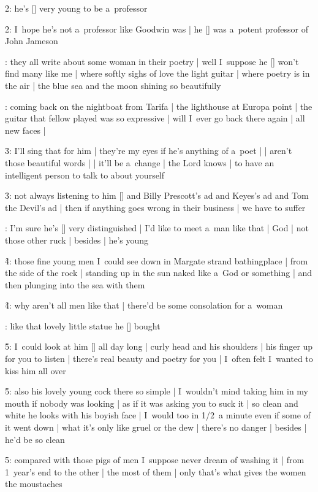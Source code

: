 \f2:
he's [\stephen] very young to be a~professor

\f2:
I~hope he's not a~professor like Goodwin was |
he [\goodwin] was a~potent professor of John Jameson

:
they all write about some woman in their poetry |
well I~suppose he [\stephen] won't find many like me |
where softly sighs of love the light guitar |
where poetry is in the air |
the blue sea and the moon shining so beautifully

:
coming back on the nightboat from Tarifa |
the lighthouse at Europa point |
the guitar that fellow played was so expressive |
will I~ever go back there again |
all new faces |

\f3:
I'll sing that for him |
they're my eyes if he's anything of a~poet |
 |
aren't those beautiful words |
 |
it'll be a~change |
the Lord knows |
to have an intelligent person to talk to about yourself

\f3:
not always listening to him [\bloom] and Billy Prescott's ad
and Keyes's ad and Tom the Devil's ad |
then if anything goes wrong in their business |
we have to suffer

:
I'm sure he's [\stephen] very distinguished |
I'd like to meet a~man like that |
God |
not those other ruck |
besides |
he's young

\f4:
those fine young men I~could see down in Margate strand bathingplace |
from the side of the rock |
standing up in the sun naked like a~God or something |
and then plunging into the sea with them

\f4:
why aren't all men like that |
there'd be some consolation for a~woman

:
like that lovely little statue he [\bloom] bought

\f5:
I~could look at him [\statue] all day long |
curly head and his shoulders |
his finger up for you to listen |
there's real beauty and poetry for you |
I~often felt I~wanted to kiss him all over

\f5:
also his lovely young cock there so simple |
I~wouldn't mind taking him in my mouth if nobody was looking |
as if it was asking you to suck it |
so clean and white he looks with his boyish face |
I~would too in 1/2~a minute even if some of it went down |
what it's only like gruel or the dew |
there's no danger |
besides |
he'd be so clean

\f5:
compared with those pigs of men I~suppose never dream of washing it |
from 1~year's end to the other |
the most of them |
only that's what gives the women the moustaches

